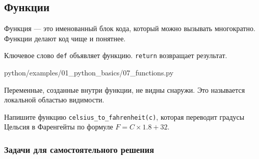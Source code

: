 \subsection{Функции}

Функция — это именованный блок кода, который можно вызывать многократно. Функции делают код чище и понятнее.

Ключевое слово \texttt{def} объявляет функцию. \texttt{return} возвращает результат.

\begin{codefile}[python]{python/examples/01_python_basics/07_functions.py}
\end{codefile}

\begin{infobox}
Переменные, созданные внутри функции, не видны снаружи. Это называется локальной областью видимости.
\end{infobox}

\begin{taskbox}[Конвертер]
Напишите функцию \texttt{celsius\_to\_fahrenheit(c)}, которая переводит градусы Цельсия в Фаренгейты по формуле $F = C \times 1.8 + 32$.
\end{taskbox}

\subsubsection*{Задачи для самостоятельного решения}

